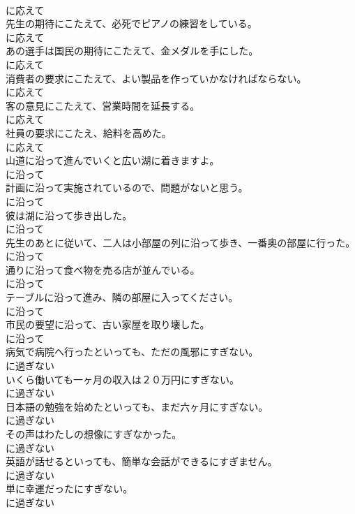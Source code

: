 \documentclass[8pt]{extreport}
\begin{document}
\begin{CJK}{UTF8}{min}
\\	に応えて
\\	先生の期待にこたえて、必死でピアノの練習をしている。	
\\	に応えて
\\	あの選手は国民の期待にこたえて、金メダルを手にした。	
\\	に応えて
\\	消費者の要求にこたえて、よい製品を作っていかなければならない。	
\\	に応えて
\\	客の意見にこたえて、営業時間を延長する。	
\\	に応えて
\\	社員の要求にこたえ、給料を高めた。	
\\	に応えて
\\	山道に沿って進んでいくと広い湖に着きますよ。	
\\	に沿って
\\	計画に沿って実施されているので、問題がないと思う。	
\\	に沿って
\\	彼は湖に沿って歩き出した。	
\\	に沿って
\\	先生のあとに従いて、二人は小部屋の列に沿って歩き、一番奥の部屋に行った。	
\\	に沿って
\\	通りに沿って食べ物を売る店が並んでいる。	
\\	に沿って
\\	テーブルに沿って進み、隣の部屋に入ってください。	
\\	に沿って
\\	市民の要望に沿って、古い家屋を取り壊した。	
\\	に沿って
\\	病気で病院へ行ったといっても、ただの風邪にすぎない。	
\\	に過ぎない
\\	いくら働いても一ヶ月の収入は２０万円にすぎない。	
\\	に過ぎない
\\	日本語の勉強を始めたといっても、まだ六ヶ月にすぎない。	
\\	に過ぎない
\\	その声はわたしの想像にすぎなかった。	
\\	に過ぎない
\\	英語が話せるといっても、簡単な会話ができるにすぎません。	
\\	に過ぎない
\\	単に幸運だったにすぎない。	
\\	に過ぎない

\end{CJK}
\end{document}
